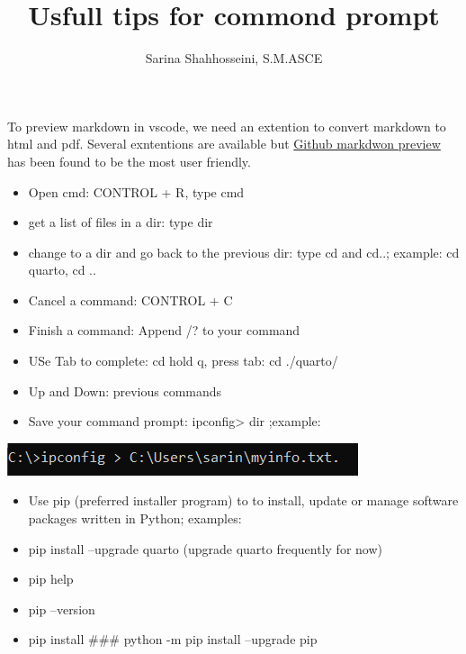 \documentclass[
  letterpaper,
  DIV=11,
  numbers=noendperiod]{scrartcl}
\author{Sarina Shahhosseini, S.M.ASCE}
\date{}
\providecommand{\tightlist}{%
  \setlength{\itemsep}{0pt}\setlength{\parskip}{0pt}}\usepackage{longtable,booktabs,array}
\begin{document}
\ifdefined\Shaded\renewenvironment{Shaded}{\begin{tcolorbox}[boxrule=0pt, interior hidden, sharp corners, enhanced, breakable, frame hidden, borderline west={3pt}{0pt}{shadecolor}]}{\end{tcolorbox}}\fi

\title{Usfull tips for commond prompt}

\maketitle

To preview markdown in vscode, we need an extention to convert markdown
to html and pdf. Several exntentions are available but
\href{https://marketplace.visualstudio.com/items?itemName=bierner.markdown-preview-github-styles}{Github
markdwon preview} has been found to be the most user friendly.

\begin{itemize}
\tightlist
\item
  Open cmd: CONTROL + R, type cmd
\item
  get a list of files in a dir: type dir
\item
  change to a dir and go back to the previous dir: type cd and cd..;
  example: cd quarto, cd ..
\item
  Cancel a command: CONTROL + C
\item
  Finish a command: Append /? to your command
\item
  USe Tab to complete: cd hold q, press tab: cd ./quarto/
\item
  Up and Down: previous commands
\item
  Save your command prompt: ipconfig\textgreater{} dir ;example:
\end{itemize}

\includegraphics{img/ipcon.png}

\begin{itemize}
\tightlist
\item
  Use pip (preferred installer program) to to install, update or manage
  software packages written in Python; examples:
\item
  pip install --upgrade quarto (upgrade quarto frequently for now)
\item
  pip help
\item
  pip --version
\item
  pip install \#\#\# python -m pip install --upgrade pip
\end{itemize}
\end{document}
